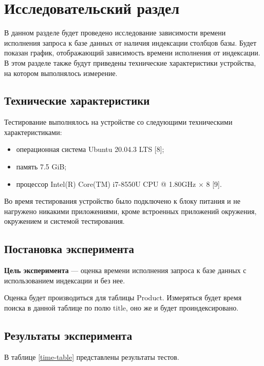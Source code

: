 \chapter{Исследовательский раздел}
В данном разделе будет проведено исследование зависимости времени исполнения запроса к базе данных от наличия индексации столбцов базы. Будет показан график, отображающий зависимость времени исполнения от индексации. В этом разделе также будут приведены технические характеристики устройства, на котором выполнялось измерение.

\section{Технические характеристики}
Тестирование выполнялось на устройстве со следующими техническими характеристиками:
\begin{itemize}
	\item операционная система Ubuntu 20.04.3 LTS [8];
	\item память 7.5 GiB;
	\item процессор Intel(R) Core(TM) i7-8550U CPU @ 1.80GHz × 8 [9].
\end{itemize}

Во время тестирования устройство было подключено к блоку питания и не нагружено никакими приложениями, кроме встроенных приложений окружения, окружением и системой тестирования.

\section{Постановка эксперимента}

\textbf{Цель эксперимента} --- оценка времени исполнения запроса к базе данных с использованием индексации и без нее.

Оценка будет производиться для таблицы Product. Измеряться будет время поиска в данной таблице по полю title, оно же и будет проиндексировано.

\section{Результаты эксперимента}

В таблице \ref{time-table} представлены результаты тестов.

